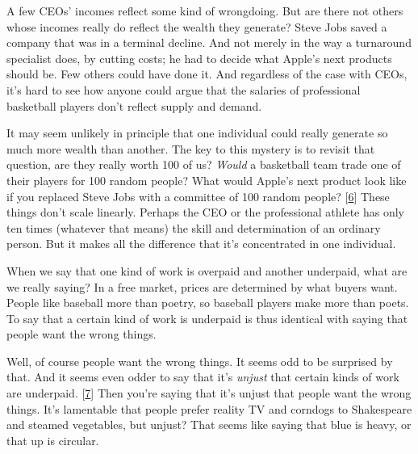 A few CEOs' incomes reflect some kind
                  of wrongdoing. But are there not others whose incomes really
                  do reflect the wealth they generate? Steve Jobs saved a
                  company that was in a terminal decline. And not merely in the
                  way a turnaround specialist does, by cutting costs; he had to
                  decide what Apple's next products should be. Few others could
                  have done it. And regardless of the case with CEOs, it's hard
                  to see how anyone could argue that the salaries of
                  professional basketball players don't reflect supply and
                  demand.

It may seem unlikely in principle that one
                  individual could really generate so much more wealth than
                  another. The key to this mystery is to revisit that question,
                  are they really worth 100 of us? \emph{Would} a basketball
                  team trade one of their players for 100 random people? What
                  would Apple's next product look like if you replaced Steve
                  Jobs with a committee of 100 random people?
                  [\href{\#f6n}{6}]
                  These things don't scale linearly. Perhaps the CEO or the
                  professional athlete has only ten times (whatever that means)
                  the skill and determination of an ordinary person. But it
                  makes all the difference that it's concentrated in one
                  individual.

When we say that one kind of work is
                  overpaid and another underpaid, what are we really saying? In
                  a free market, prices are determined by what buyers want.
                  People like baseball more than poetry, so baseball players
                  make more than poets. To say that a certain kind of work is
                  underpaid is thus identical with saying that people want the
                  wrong things.

Well, of course people want the wrong
                  things. It seems odd to be surprised by that. And it seems
                  even odder to say that it's \emph{unjust} that certain kinds
                  of work are underpaid.
                  [\href{\#f7n}{7}]
                  Then you're saying that it's unjust that people want the wrong
                  things. It's lamentable that people prefer reality TV and
                  corndogs to Shakespeare and steamed vegetables, but unjust?
                  That seems like saying that blue is heavy, or that up is
                  circular.

